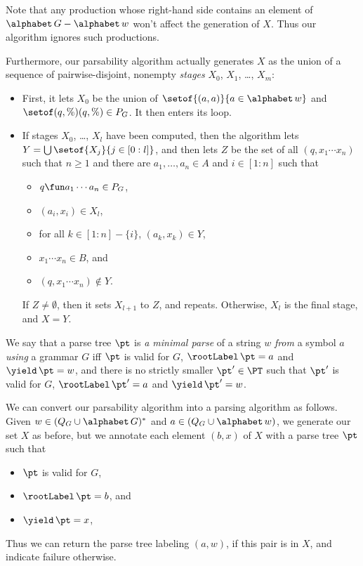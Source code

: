 Note that any production whose right-hand side contains an element of
$\alphabet\,G-\alphabet\,w$ won't affect the generation of $X$.  Thus
our algorithm ignores such productions.

Furthermore, our parsability algorithm actually generates $X$ as the
union of a sequence of pairwise-disjoint, nonempty \emph{stages}
$X_0$, $X_1$, \ldots, $X_m$:
\begin{itemize}
\item First, it lets $X_0$ be the union of
  $\setof{(a,a)}{a\in\alphabet\,w}$ and $\setof{(q,\%)}{(q,\%)\in
    P_G}$.  It then enters its loop.

\item If stages $X_0$, \ldots, $X_l$ have been computed, then the
  algorithm lets $Y=\bigcup\setof{X_j}{j\in[0:l]}$, and then lets
  $Z$ be the set of all $(q,x_1\cdots x_n)$ such that $n\geq 1$ and
  there are $a_1,\ldots,a_n\in A$ and $i\in[1:n]$
  such that
  \begin{itemize}
  \item $q\fun a_1\cdots a_n\in P_G$,

  \item $(a_i,x_i)\in X_l$,

  \item for all $k\in[1:n]-\{i\}$, $(a_k,x_k)\in Y$,

  \item $x_1\cdots x_n\in B$, and

  \item $(q,x_1\cdots x_n)\not\in Y$.
  \end{itemize}
    If $Z\neq\emptyset$, then it sets $X_{l+1}$ to $Z$, and repeats.
  Otherwise, $X_l$ is the final stage, and $X=Y$.
\end{itemize}

We say that a parse tree $\pt$ is \emph{a minimal parse} of a string
$w$ \emph{from} a symbol $a$ \emph{using} a grammar $G$ iff $\pt$ is
valid for $G$, $\rootLabel\,\pt = a$ and $\yield\,\pt = w$, and there
is no strictly smaller $\pt'\in\PT$ such that $\pt'$ is valid for $G$,
$\rootLabel\,\pt' = a$ and $\yield\,\pt' = w$.

We can convert our parsability algorithm into a parsing algorithm as
follows.  Given $w\in(Q_G\cup\alphabet\,G)^*$ and
$a\in(Q_G\cup\alphabet\,w)$, we generate our set $X$ as before, but we
annotate each element $(b,x)$ of $X$ with a parse tree $\pt$ such that
\begin{itemize}
\item $\pt$ is valid for $G$,

\item $\rootLabel\,\pt=b$, and

\item $\yield\,\pt=x$,
\end{itemize}
Thus we can return the parse tree labeling $(a, w)$, if this pair is
in $X$, and indicate failure otherwise.

